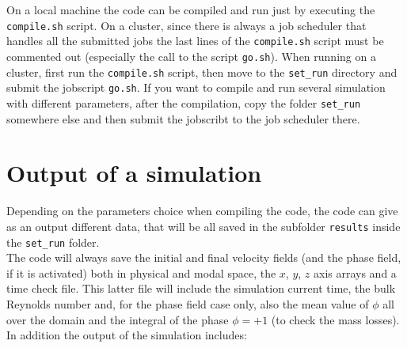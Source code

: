 On a local machine the code can be compiled and run just by executing the \texttt{compile.sh} script. On a cluster, since there is always a job scheduler that handles all the submitted jobs the last lines of the \texttt{compile.sh} script must be commented out (especially the call to the script \texttt{go.sh}). When running on a cluster, first run the \texttt{compile.sh} script, then move to the \texttt{set\_run} directory and submit the jobscript \texttt{go.sh}. If you want to compile and run several simulation with different parameters, after the compilation, copy the folder \texttt{set\_run} somewhere else and then submit the jobscribt to the job scheduler there.\\

\section{Output of a simulation}
Depending on the parameters choice when compiling the code, the code can give as an output different data, that will be all saved in the subfolder \texttt{results} inside the \texttt{set\_run} folder.\\
The code will always save the initial and final velocity fields (and the phase field, if it is activated) both in physical and modal space, the $x$, $y$, $z$ axis arrays and a time check file. This latter file will include the simulation current time, the bulk Reynolds number and, for the phase field case only, also the mean value of $\phi$ all over the domain and the integral of the phase $\phi=+1$ (to check the mass losses).\\
In addition the output of the simulation includes:

